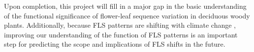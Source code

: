 \documentclass[11pt]{article}
\begin{document}
Upon completion, this project will fill in a major gap in the basic understanding of the functional significance of flower-leaf sequence variation in deciduous woody plants. Additionally, because FLS patterns are shifting with climate change \citep{Buonaiuto2020, Augspurger:2020aa}, improving our understanding of the function of FLS patterns is an important step for predicting the scope and implications of FLS shifts in the future.


\end{document}
